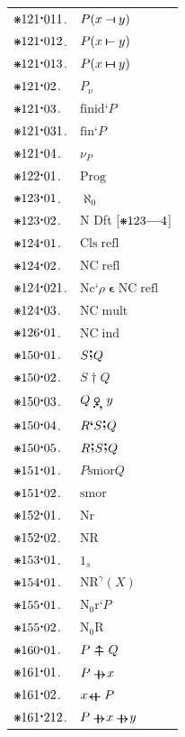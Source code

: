 \documentclass[12pt,openany,leqno,twocolumn]{book}
\newcommand{\pmast}{\text{\resizebox{!}{.75\height}{\ding{107}}}} %
\newcommand{\pmcdot}{\text{\raisebox{.05cm}{$\boldsymbol\cdot$}}} %
\newcommand{\pmd}{\hbox{\rule{.3ex}{.3ex}}} %
\newcommand{\pmdot}{\mathinner{\pmd}}
\newcommand{\pmcin}{\mathop{\boldsymbol{\epsilon}}} %
\newcommand{\pmdscf}[2]{#1\textbf{`}#2} %
\newcommand{\Female}{{\usefont{U}{mvs}{m}{n}\symbol{126}}} %
\newcommand{\pmnc}[1]{\text{Nc}\textbf{`}#1} %
\newcommand{\pmintoc}[2]{P({#1}\mathbin{\scalebox{1.2}[.7]{$\boldsymbol{\dashv}$}}{#2})} %
\newcommand{\pmintco}[2]{P({#1}\mathbin{\scalebox{1.2}[.7]{$\boldsymbol{\vdash}$}}{#2})} %
\newcommand{\pmintcc}[2]{P({#1} \mathbin{\ooalign{$\scalebox{1.2}[.7]{$\boldsymbol{\dashv}$}$\hidewidth\cr$\scalebox{1.2}[.7]{$\boldsymbol{\vdash}$}$}} {#2})} %
\newcommand{\pmintnc}[1]{P_{#1}} %
\newcommand{\pmfinid}[1]{\text{finid}\textbf{`}#1} %
\newcommand{\pmfin}[1]{\text{fin}\textbf{`}#1} %
\newcommand{\pmintt}[2]{#1_{#2}} %
\newcommand{\pmprog}{\text{Prog}} %
\newcommand{\pmaleph}{\boldsymbol{\aleph}} %
\newcommand{\pmsucc}{\text{N}} %
\newcommand{\pmclsrefl}{\text{Cls}\;\text{refl}} %
\newcommand{\pmncrefl}{\text{NC}\;\text{refl}} %
\newcommand{\pmncmult}{\text{NC}\;\text{mult}} %
\newcommand{\pmncind}{\text{NC}\;\text{ind}} %
\newcommand{\pmrnsm}[2]{{#1}{\raise.4ex\hbox{\textbf{\large;}}}{#2}} %
\newcommand{\pmrnsmd}[2]{#1 \mathop{\boldsymbol{\dagger}} #2} %
\newcommand{\pmopsc}[2]{#1 \mathrel{\ooalign{${\raise-.7ex\hbox{$\pmdot$}}$\hidewidth\cr$\text{\Female}$\hidewidth\cr${\raise-.8ex\hbox{\hspace{.15cm}\textbf{,}}}$}} #2} %
\newcommand{\pmsmorb}[2]{#1 \mathrel{\overline{\text{smor}}} #2} %
\newcommand{\pmSmor}{\text{smor}}
\newcommand{\pmNr}{\text{Nr}}
\newcommand{\pmNR}{\text{NR}} %
\newcommand{\pmsrrn}[1]{{#1}_{s}} %
\newcommand{\pmNRat}[2]{\text{NR}^{#1}({#2})} %
\newcommand{\pmnor}[1]{\text{N}_0\text{r}\textbf{`}#1} %
\newcommand{\pmNoR}{\text{N}_0\text{R}} %
\newcommand{\pmrsum}[2]{#1\mathrel{\ooalign{${\raise-.21ex\hbox{$\boldsymbol{-}$}}$\cr\hidewidth$\boldsymbol{\uparrow}$\hidewidth\cr${\raise-.19ex\hbox{$\boldsymbol{-}$}}$}} #2} %
\newcommand{\pmRsum}{\mathrel{\ooalign{${\raise-.21ex\hbox{$\boldsymbol{-}$}}$\cr\hidewidth$\boldsymbol{\uparrow}$\hidewidth\cr${\raise-.19ex\hbox{$\boldsymbol{-}$}}$}}}
\newcommand{\pmrsume}[2]{#1 \mathrel{\rotatebox[origin=c]{270}{$\pmRsum$}} #2} %
\newcommand{\pmrsumb}[2]{#1 \mathrel{\rotatebox[origin=c]{90}{$\pmRsum$}} #2} %
\newcommand{\pmalephn}[1]{\pmaleph_{#1}} %
\begin{document}
\begin{tabular}{l l}
	$\pmast121\pmcdot011$. & $\pmintoc{x}{y}$ \\
	$\pmast121\pmcdot012$. & $\pmintco{x}{y}$ \\
	$\pmast121\pmcdot013$. & $\pmintcc{x}{y}$ \\
	$\pmast121\pmcdot02$. & $\pmintnc{\nu}$ \\
	$\pmast121\pmcdot03$. & $\pmfinid{P}$ \\
	$\pmast121\pmcdot031$. & $\pmfin{P}$ \\
	$\pmast121\pmcdot04$. & $\pmintt{\nu}{P}$ \\
	$\pmast122\pmcdot01$. & $\pmprog$ \\
	$\pmast123\pmcdot01$. & $\pmalephn{0}$ \\
	$\pmast123\pmcdot02$. & $\pmsucc$ Dft [$\pmast123\textbf{---}4$] \\
	$\pmast124\pmcdot01$. & $\pmclsrefl$ \\
	$\pmast124\pmcdot02$. & $\pmncrefl$ \\
	$\pmast124\pmcdot021$. & $\pmnc{\rho}\pmcin \pmncrefl$ \\
	$\pmast124\pmcdot03$. & $\pmncmult$ \\
	$\pmast126\pmcdot01$. & $\pmncind$ \\
	$\pmast150\pmcdot01$. & $\pmrnsm{S}{Q}$ \\
	$\pmast150\pmcdot02$. & $\pmrnsmd{S}{Q}$ \\
	$\pmast150\pmcdot03$. & $\pmopsc{Q}{y}$ \\
	$\pmast150\pmcdot04$. & $\pmdscf{R}{\pmrnsm{S}{Q}}$ \\
	$\pmast150\pmcdot05$. & $\pmrnsm{R}{\pmrnsm{S}{Q}}$ \\
	$\pmast151\pmcdot01$. & $\pmsmorb{P}{Q}$ \\
	$\pmast151\pmcdot02$. & $\pmSmor$ \\
	$\pmast152\pmcdot01$. & $\pmNr$ \\
	$\pmast152\pmcdot02$. & $\pmNR$ \\
	$\pmast153\pmcdot01$. & $\pmsrrn{1}$ \\
	$\pmast154\pmcdot01$. & $\pmNRat{\gamma}{X}$ \\
	$\pmast155\pmcdot01$. & $\pmnor{P}$ \\
	$\pmast155\pmcdot02$. & $\pmNoR$ \\
	$\pmast160\pmcdot01$. & $\pmrsum{P}{Q}$ \\
	$\pmast161\pmcdot01$. & $\pmrsume{P}{x}$ \\
	$\pmast161\pmcdot02$. & $\pmrsumb{x}{P}$ \\
	$\pmast161\pmcdot212$. & $\pmrsume{P}{\pmrsume{x}{y}}$ 
\end{tabular}
\end{document}

